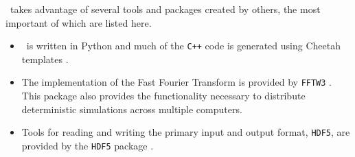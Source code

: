 \xpdeint\ takes advantage of several tools and packages created by others, the most important of which are listed here.
\begin{itemize}
    \item \xpdeint\ is written in Python \citep{Python} and much of the \texttt{C++} code is generated using Cheetah templates \citep{CheetahTemplates}.
    \item The implementation of the Fast Fourier Transform is provided by \texttt{FFTW3} \citep{Frigo:2005}.  This package also provides the functionality necessary to distribute deterministic simulations across multiple computers.
    \item Tools for reading and writing the primary input and output format, \texttt{HDF5}, are provided by the \texttt{HDF5} package \citep{HDF5}.
\end{itemize}




